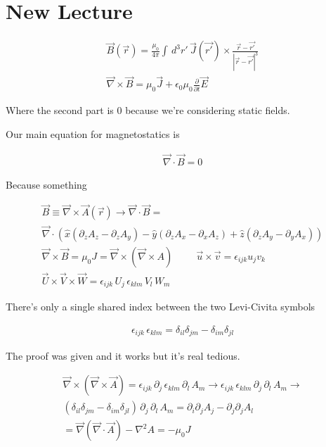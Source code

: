 \documentclass[fleqn]{report}
\newcommand{\hp}{\hspace{1cm}}
\newcommand{\del}{\partial}
\newcommand{\equations} [1] {
\begin{gather*}
#1
\end{gather*}
}
\begin{document}
\section{New Lecture}

\equations{
    \vec B(\vec r) = \frac{\mu_0}{4 \pi}
    \int \, d^3 r' \, 
    \vec J(\vec{r'}) \times 
    \frac{\vec r - \vec{r'}}{|\vec r - \vec{r'}|^3}
    \\
    \vec \nabla \times \vec B = \mu_0 \vec J 
    + 
    \epsilon_0 \mu_0 \frac{\del}{\del t} \vec E
}
Where the second part is $0$ because we're considering static fields. 

Our main equation for magnetostatics is 
\equations{
    \vec \nabla \cdot \vec B = 0
}
Because something 
\equations{
    \vec B \equiv \vec \nabla \times \vec A(\vec r)
    \rightarrow
    \vec \nabla \cdot \vec B 
    =
    \\
    \vec \nabla \cdot 
    \left(
        \hat x (\del_z A_z - \del_z A_y)
        -
        \hat y (\del_z A_x - \del_x A_z)
        +
        \hat z (\del_z A_y - \del_y A_x)
    \right)
    \\
    \vec \nabla \times \vec B 
    =
    \mu_0 J 
    =
    \vec \nabla \times (\vec \nabla \times A)
    \hp 
    \vec u \times \vec v 
    =
    \epsilon_{ijk} u_j v_k
    \\
    \vec U 
    \times 
    \vec V 
    \times
    \vec W 
    =
    \epsilon_{ijk} \, U_j \, 
    \epsilon_{klm} \, V_l \, W_m 
}
There's only a single shared index between the two Levi-Civita symbols 

\equations{
    \epsilon_{ijk} \, 
    \epsilon_{klm}
    = 
    \delta_{il} \delta_{jm} - \delta_{im} \delta_{jl}
}
The proof was given and it works but it's real tedious.

\equations{
    \vec \nabla \times (\vec \nabla \times \vec A)
    =
    \epsilon_{ijk} \, 
    \del_j \, 
    \epsilon_{klm} \, 
    \del_l \, A_m
    \rightarrow 
    \epsilon_{ijk} \, 
    \epsilon_{klm} \, 
    \del_j \, 
    \del_l \, A_m
    \rightarrow 
    \\
    (\delta_{il} \delta_{jm} - \delta_{im} \delta_{jl}) \, 
    \del_j \, 
    \del_l \, A_m
    =
    \del_i \del_j A_j - \del_j \del_j A_l
    \\
    =
    \vec \nabla (\vec \nabla \cdot \vec A) - \nabla^2 A = -\mu_0 J
}
\end{document}
